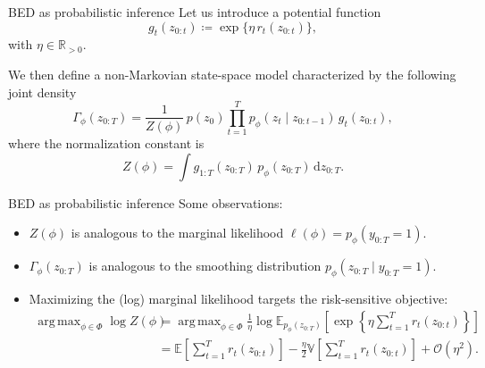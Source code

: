 \documentclass[10pt, aspectratio=1610]{beamer}
\DeclareMathOperator*{\argmax}{arg\,max}
\newcommand{\dd}{\mathrm{d}}
\begin{document}
    \begin{frame}{BED as probabilistic inference}
      Let us introduce a potential function
      \begin{equation}\label{eq:potential-function}
        g_{t}(z_{0:t}) \coloneq \exp \Big\{ \eta \, r_{t}(z_{0:t}) \Big\},
      \end{equation}
      with $\eta \in \mathbb{R}_{>0}$.

      \vspace{0.3cm}
      We then define a non-Markovian state-space model characterized by the following joint density
      \begin{equation}\label{eq:pathwise_smoothing_trajectory}
        \Gamma_\phi(z_{0:T}) = \frac{1}{Z(\phi)} \, p(z_0) \prod_{t=1}^T p_\phi(z_t \mid z_{0:t-1}) \, g_t(z_{0:t}),
      \end{equation}
      where the normalization constant is
      \begin{equation}
        Z(\phi) = \int g_{1:T}(z_{0:T}) \, p_\phi(z_{0:T}) \, \dd z_{0:T}.
      \end{equation}
    \end{frame}

    \begin{frame}{BED as probabilistic inference}
      Some observations:
      \begin{itemize}
        \item $Z(\phi)$ is analogous to the marginal likelihood $\ell(\phi) = p_\phi(y_{0:T} = 1)$.
        \item $\Gamma_\phi(z_{0:T})$ is analogous to the smoothing distribution $p_\phi(z_{0:T} \mid y_{0:T} = 1)$.
        \item Maximizing the (log) marginal likelihood targets the risk-sensitive objective:
          \begin{align}
            \argmax_{\phi \in \Phi} \log Z(\phi) &= \argmax_{\phi \in \Phi} \frac{1}{\eta} \log \mathbb{E}_{p_\phi(z_{0:T})} \left[\exp \left\{\eta \sum_{t=1}^T r_t(z_{0:t})\right\}\right] \\
            &= \mathbb{E} \left[\sum_{t=1}^T r_t(z_{0:t})\right] - \frac{\eta}{2} \mathbb{V} \left[ \sum_{t=1}^T r_t(z_{0:t}) \right] + \mathcal{O}(\eta^2).
          \end{align}
      \end{itemize}
    \end{frame}
\end{document}
